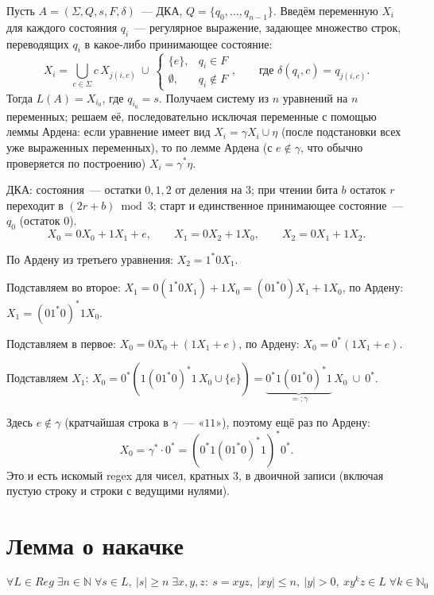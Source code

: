 \documentclass[12pt]{article}
\begin{document}
	Пусть $A = (\Sigma, Q, s, F, \delta)$~--- ДКА, $Q = \{ q_0, \ldots, q_{n-1} \}$. Введём переменную $X_i$ для каждого состояния $q_i$~--- регулярное выражение, задающее множество строк, переводящих $q_i$ в какое-либо принимающее состояние:
	\[
	X_i = \bigcup_{c \in \Sigma} c \, X_{j(i,c)} \ \cup \ \begin{cases} \{e\}, & q_i \in F \\ \emptyset, & q_i \notin F \end{cases}, \qquad \text{где } \delta(q_i, c) = q_{j(i,c)}.
	\]
	Тогда $L(A) = X_{i_0}$, где $q_{i_0} = s$. Получаем систему из $n$ уравнений на $n$ переменных; решаем её, последовательно исключая переменные с помощью леммы Ардена: если уравнение имеет вид $X_i = \gamma X_i \cup \eta$ (после подстановки всех уже выраженных переменных), то по лемме Ардена (с $e \notin \gamma$, что обычно проверяется по построению) $X_i = \gamma^* \eta$.
	
	\begin{example}
		ДКА: состояния~--- остатки $0,1,2$ от деления на $3$; при чтении бита $b$ остаток $r$ переходит в $(2r+b) \bmod 3$; старт и единственное принимающее состояние~--- $q_0$ (остаток $0$).
		\[
		X_0 = 0X_0 + 1X_1 + e, \qquad X_1 = 0X_2 + 1X_0, \qquad X_2 = 0X_1 + 1X_2.
		\]
		
		По Ардену из третьего уравнения: $X_2 = 1^*0X_1$.
		
		Подставляем во второе: $X_1 = 0(1^*0X_1) + 1X_0 = (01^*0)X_1 + 1X_0$, по Ардену: $X_1 = (01^*0)^*1X_0$.
		
		Подставляем в первое: $X_0 = 0X_0 + (1X_1 + e)$, по Ардену: $X_0 = 0^*(1X_1 + e)$.
		
		Подставляем $X_1$: $X_0 = 0^*\left(1(01^*0)^*1\,X_0 \cup \{e\}\right) = \underbrace{0^*1(01^*0)^*1}_{=: \gamma}\, X_0 \ \cup \ 0^*$.
		
		Здесь $e \notin \gamma$ (кратчайшая строка в $\gamma$~--- «$11$»), поэтому ещё раз по Ардену:
		\[
		X_0 = \gamma^* \cdot 0^* = \left( 0^*1(01^*0)^*1 \right)^* 0^*.
		\]
		Это и есть искомый regex для чисел, кратных $3$, в двоичной записи (включая пустую строку и строки с ведущими нулями).
	\end{example}
	
	\section{Лемма о накачке}
	
	\begin{lemma}[О накачке]
		\[
		\forall L \in Reg \; \exists n \in \mathbb{N} \; \forall s \in L,\ |s| \geqslant n \; \exists x, y, z:\ s = xyz,\ |xy| \leqslant n,\ |y| > 0,\ xy^k z \in L \; \forall k \in \mathbb{N}_0
		\]
	\end{lemma}
	
\end{document}
